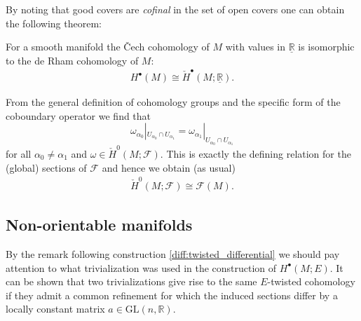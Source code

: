     By noting that good covers are \textit{cofinal} in the set of open covers one can obtain the following theorem:
    \begin{theorem}[\v{C}ech $=$ de Rham, bis]
        For a smooth manifold the \v{C}ech cohomology of $M$ with values in $\underline{\mathbb{R}}$ is isomorphic to the de Rham cohomology of $M$:
        \begin{gather}
            H^\bullet(M)\cong\check{H}^\bullet(M;\underline{\mathbb{R}}).
        \end{gather}
    \end{theorem}

    \begin{example}
        From the general definition of cohomology groups and the specific form of the coboundary operator we find that \[\omega_{\alpha_0}|_{U_{\alpha_0}\cap U_{\alpha_1}}=\omega_{\alpha_1}|_{U_{\alpha_0}\cap U_{\alpha_1}}\] for all $\alpha_0\neq\alpha_1$ and $\omega\in\check{H}^0(M;\mathcal{F})$. This is exactly the defining relation for the (global) sections of $\mathcal{F}$ and hence we obtain (as usual)
        \begin{gather}
            \check{H}^0(M;\mathcal{F})\cong\mathcal{F}(M).
        \end{gather}
    \end{example}

\subsection{Non-orientable manifolds}

    \begin{remark}
        By the remark following construction \ref{diff:twisted_differential} we should pay attention to what trivialization was used in the construction of $H^\bullet(M; E)$. It can be shown that two trivializations give rise to the same $E$-twisted cohomology if they admit a common refinement for which the induced sections differ by a locally constant matrix $a\in\text{GL}(n, \mathbb{R})$.
    \end{remark}

